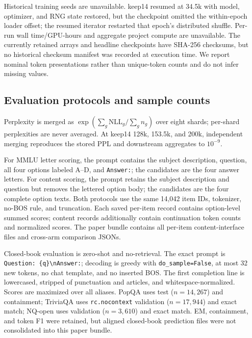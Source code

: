 Historical training seeds are unavailable. keep14 resumed at 34.5k with model,
optimizer, and RNG state restored, but the checkpoint omitted the within-epoch
loader offset; the resumed iterator restarted that epoch's distributed shuffle.
Per-run wall time/GPU-hours and aggregate project compute are unavailable.
The currently retained arrays and headline checkpoints have SHA-256 checksums,
but no historical checksum manifest was recorded at execution time. We report nominal token presentations rather than unique-token counts
and do not infer missing values.

\subsection{Evaluation protocols and sample counts}


Perplexity is merged as
$\exp(\sum_g\mathrm{NLL}_g/\sum_g n_g)$ over eight shards; per-shard
perplexities are never averaged. At keep14 128k, 153.5k, and 200k, independent
merging reproduces the stored PPL and downstream aggregates to $10^{-9}$.

For MMLU letter scoring, the prompt contains the subject description, question,
all four options labeled A--D, and \texttt{Answer:}; the candidates are the
four answer letters. For content scoring, the prompt retains the subject
description and question but removes the lettered option body; the candidates
are the four complete option texts. Both protocols use the same 14,042 item IDs,
tokenizer, no-BOS rule, and truncation. Each saved per-item record contains
option-level summed scores; content records additionally contain continuation
token counts and normalized scores. The paper bundle contains all per-item
content-interface files and cross-arm comparison JSONs.

Closed-book evaluation is zero-shot and no-retrieval. The exact prompt is
\texttt{Question: \{q\}\textbackslash nAnswer:}; decoding is greedy with
\texttt{do\_sample=False}, at most 32 new tokens, no chat template, and no
inserted BOS. The first completion line is lowercased, stripped of punctuation
and articles, and whitespace-normalized. Scores are maximized over all aliases.
PopQA uses test ($n{=}14{,}267$) and containment; TriviaQA uses
\texttt{rc.nocontext} validation ($n{=}17{,}944$) and exact match; NQ-open uses
validation ($n{=}3{,}610$) and exact match. EM, containment, and token F1 were
retained, but aligned closed-book prediction files were not consolidated into
this paper bundle.

